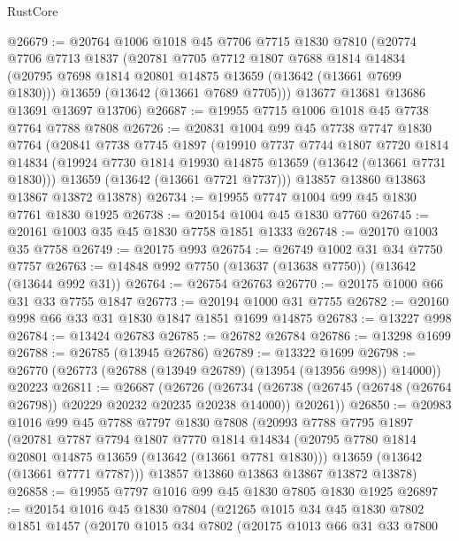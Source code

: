 \begin{lexlean}{RustCore}
\begin{coremodule}
@26679 := @20764
    @1006
    @1018
    @45
    @7706
    @7715
    @1830
    @7810
    (@20774
      @7706
      @7713
      @1837
      (@20781
        @7705
        @7712
        @1807
        @7688
        @1814
        @14834
        (@20795 @7698 @1814 @20801 @14875 @13659 (@13642 (@13661 @7699 @1830)))
        @13659
        (@13642 (@13661 @7689 @7705)))
      @13677
      @13681
      @13686
      @13691
      @13697
      @13706)
@26687 := @19955 @7715 @1006 @1018 @45 @7738 @7764 @7788 @7808
@26726 := @20831
    @1004
    @99
    @45
    @7738
    @7747
    @1830
    @7764
    (@20841
      @7738
      @7745
      @1897
      (@19910
        @7737
        @7744
        @1807
        @7720
        @1814
        @14834
        (@19924 @7730 @1814 @19930 @14875 @13659 (@13642 (@13661 @7731 @1830)))
        @13659
        (@13642 (@13661 @7721 @7737)))
      @13857
      @13860
      @13863
      @13867
      @13872
      @13878)
@26734 := @19955 @7747 @1004 @99 @45 @1830 @7761 @1830 @1925
@26738 := @20154 @1004 @45 @1830 @7760
@26745 := @20161 @1003 @35 @45 @1830 @7758 @1851 @1333
@26748 := @20170 @1003 @35 @7758
@26749 := @20175 @993
@26754 := @26749 @1002 @31 @34 @7750 @7757
@26763 := @14848 @992 @7750 (@13637 (@13638 @7750)) (@13642 (@13644 @992 @31))
@26764 := @26754 @26763
@26770 := @20175 @1000 @66 @31 @33 @7755 @1847
@26773 := @20194 @1000 @31 @7755
@26782 := @20160 @998 @66 @33 @31 @1830 @1847 @1851 @1699 @14875
@26783 := @13227 @998
@26784 := @13424 @26783
@26785 := @26782 @26784
@26786 := @13298 @1699
@26788 := @26785 (@13945 @26786)
@26789 := @13322 @1699
@26798 := @26770 (@26773 (@26788 (@13949 @26789) (@13954 (@13956 @998)) @14000)) @20223
@26811 := @26687
    (@26726
      (@26734 (@26738 (@26745 (@26748 (@26764 @26798)) @20229 @20232 @20235 @20238 @14000)) @20261))
@26850 := @20983
    @1016
    @99
    @45
    @7788
    @7797
    @1830
    @7808
    (@20993
      @7788
      @7795
      @1897
      (@20781
        @7787
        @7794
        @1807
        @7770
        @1814
        @14834
        (@20795 @7780 @1814 @20801 @14875 @13659 (@13642 (@13661 @7781 @1830)))
        @13659
        (@13642 (@13661 @7771 @7787)))
      @13857
      @13860
      @13863
      @13867
      @13872
      @13878)
@26858 := @19955 @7797 @1016 @99 @45 @1830 @7805 @1830 @1925
@26897 := @20154
    @1016
    @45
    @1830
    @7804
    (@21265
      @1015
      @34
      @45
      @1830
      @7802
      @1851
      @1457
      (@20170
        @1015
        @34
        @7802
        (@20175
          @1013
          @66
          @31
          @33
          @7800

\end{coremodule}
\end{lexlean}
